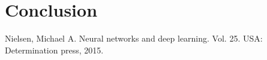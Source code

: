 \documentclass[12pt, titlepage]{article}
\begin{document}
\section{Conclusion}





\begin{thebibliography}{0}
   Nielsen, Michael A. Neural networks and deep learning. Vol. 25. USA: Determination press, 2015.
  
  


  
  
  
  
  \end{thebibliography}


 
\end{document}
